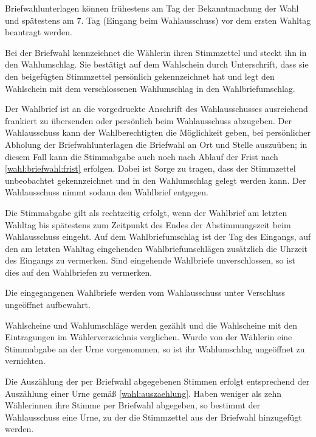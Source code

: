 \begin{jurdoc}
Briefwahlunterlagen können frühestens am Tag der Bekanntmachung der Wahl und spätestens am 7. Tag (Eingang beim Wahlausschuss) vor dem ersten Wahltag beantragt werden. \label{wahl:briefwahl:frist}

Bei der Briefwahl kennzeichnet die Wählerin ihren Stimmzettel und steckt ihn in den Wahlumschlag. Sie bestätigt auf dem Wahlschein durch Unterschrift, dass sie den beigefügten Stimmzettel persönlich gekennzeichnet hat und legt den Wahlschein mit dem verschlossenen Wahlumschlag in den Wahlbriefumschlag.

Der Wahlbrief ist an die vorgedruckte Anschrift des Wahlausschusses ausreichend frankiert zu übersenden oder persönlich beim Wahlausschuss abzugeben. Der Wahlausschuss kann der Wahlberechtigten die Möglichkeit geben, bei persönlicher Abholung der Briefwahlunterlagen die Briefwahl an Ort und Stelle auszuüben; in diesem Fall kann die Stimmabgabe auch noch nach Ablauf der Frist nach \ref{wahl:briefwahl:frist} erfolgen. Dabei ist Sorge zu tragen, dass der Stimmzettel unbeobachtet gekennzeichnet und in den Wahlumschlag gelegt werden kann. Der Wahlausschuss nimmt sodann den Wahlbrief entgegen.

Die Stimmabgabe gilt als rechtzeitig erfolgt, wenn der Wahlbrief am letzten Wahltag bis spätestens zum Zeitpunkt des Endes der Abstimmungszeit beim Wahlausschuss eingeht. Auf dem Wahlbriefumschlag ist der Tag des Eingangs, auf den am letzten Wahltag eingehenden Wahlbriefumschlägen zusätzlich die Uhrzeit des Eingangs zu vermerken. Sind eingehende Wahlbriefe unverschlossen, so ist dies auf den Wahlbriefen zu vermerken.

Die eingegangenen Wahlbriefe werden vom Wahlausschuss unter Verschluss ungeöffnet aufbewahrt.

Wahlscheine und Wahlumschläge werden gezählt und die Wahlscheine mit den Eintragungen im Wählerverzeichnis verglichen. Wurde von der Wählerin eine Stimmabgabe an der Urne vorgenommen, so ist ihr Wahlumschlag ungeöffnet zu vernichten.

Die Auszählung der per Briefwahl abgegebenen Stimmen erfolgt entsprechend der Auszählung einer Urne gemäß \ref{wahl:auszaehlung}. Haben weniger als zehn Wählerinnen ihre Stimme per Briefwahl abgegeben, so bestimmt der Wahlausschuss eine Urne, zu der die Stimmzettel aus der Briefwahl hinzugefügt werden.

\label{wahl:stimmzettel}


\end{jurdoc}

